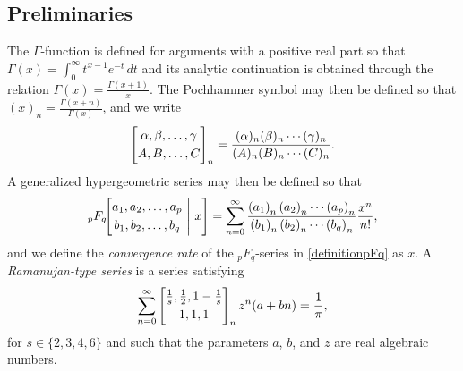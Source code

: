 \documentclass[12pt]{article}
\begin{document}
\subsection{Preliminaries}\label{sectionPrelim}
 The $\Gamma$-function is defined for arguments with a positive real part so that $\Gamma(x) = \int_{0}^{\infty} t^{x-1} e^{-t} \, dt$ 
 and its analytic continuation is obtained through the relation $\Gamma(x) = \frac{\Gamma(x+1)}{x}$. The Pochhammer symbol may 
 then be defined so that $(x)_{n} = \frac{\Gamma(x+n)}{\Gamma(x)}$, and we write 
\begin{equation}\label{ChuordinaryPochhammer}
 \left[ \begin{matrix} \alpha, \beta, \ldots, \gamma \vspace{1mm} \\ 
 A, B, \ldots, C \end{matrix} \right]_{n} = \frac{ (\alpha)_{n} (\beta)_{n} 
 \cdots (\gamma)_{n} }{ (A)_{n} (B)_{n} \cdots (C)_{n}}. 
\end{equation}
 A generalized hypergeometric series may then be defined so that 
\begin{equation}\label{definitionpFq}
 {}_{p}F_{q}\!\!\left[ \begin{matrix} 
 a_{1}, a_{2}, \ldots, a_{p} \vspace{1mm}\\ 
 b_{1}, b_{2}, \ldots, b_{q} \end{matrix} \ \Bigg| \ x 
 \right] = \sum_{n=0}^{\infty} 
 \frac{ \left( a_{1} \right)_{n} \left( a_{2} \right)_{n} 
 \cdots \left( a_{p} \right)_{n} }{ \left( b_{1} \right)_{n} 
 \left( b_{2} \right)_{n} \cdots \left( b_{q} \right)_{n} } 
 \frac{x^{n}}{n!}, 
\end{equation}
 and we define the \emph{convergence rate} of the ${}_{p}F_{q}$-series in \eqref{definitionpFq} as $x$. 
 A \emph{Ramanujan-type 
 series} is a series satisfying 
\begin{equation*}
 \sum_{n = 
 0}^{\infty} 
 \left[ \begin{matrix} \frac{1}{s}, \frac{1}{2}, 1 - \frac{1}{s} 
 \vspace{1mm} \\ 
 1, 1, 1 \end{matrix} \right]_{n} z^n (a + b n) = \frac{1}{\pi}, 
\end{equation*}
 for $s \in \{ 2, 3, 4, 6 \}$ and such that the parameters $a$, $b$, and $z$ are real algebraic numbers. 
\end{document}
